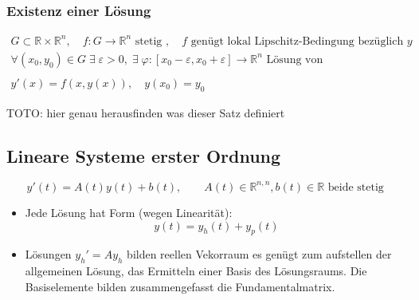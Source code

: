 \documentclass[a4paper]{article}
\newcommand{\R}{\mathbb{R}}
\begin{document}
\subsubsection{Existenz einer Lösung}
\begin{gather*}
	G\subset \R \times \R ^{n}, \quad
	f: G \rightarrow \R ^{n} \text{ stetig }, \quad
	f \text{ genügt lokal Lipschitz-Bedingung bezüglich } y \\
	\forall (x_0, y_0) \in G \; \exists \; \varepsilon > 0, \;
	\exists \; \varphi : [x_0 - \varepsilon, x_0 + \varepsilon] \rightarrow \R ^{n}
	\text{ Lösung von } \\
	\\
	y' (x) = f(x, y(x)), \quad y(x_0) = y_0
\end{gather*}

TOTO: hier genau herausfinden was dieser Satz definiert

\subsection{Lineare Systeme erster Ordnung}
\[
	y'(t) = A(t) y(t) +b(t), \qquad
	A(t) \in \R ^{n,n}, b(t) \in \R
	\text{ beide stetig }
\] 

\begin{itemize}
	\item Jede Lösung hat Form (wegen Linearität):
		\[
			y(t) = y_h (t) + y_p (t)
		\] 
	\item Lösungen $y_h ' = A y_h$ bilden reellen Vekorraum
		es genügt zum aufstellen der allgemeinen Lösung, das Ermitteln einer
		Basis des Lösungsraums. Die Basiselemente bilden zusammengefasst
		die Fundamentalmatrix.
\end{itemize}
\end{document}

